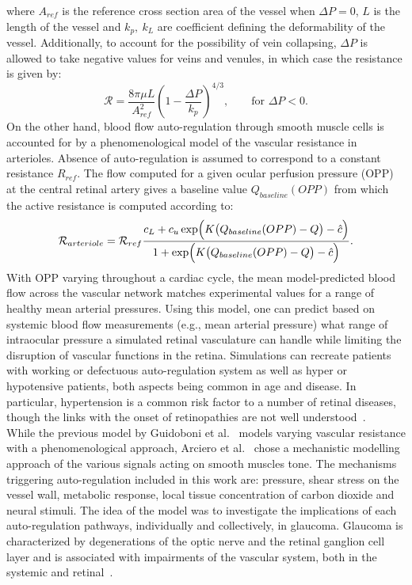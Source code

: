 \documentclass[12pt,a4paper]{journal}
\begin{document}
where $A_{ref}$ is the reference cross section area of the vessel when $\Delta P = 0$, $L$ is the length of the vessel and $k_p,~k_L$ are coefficient defining the deformability of the vessel.
Additionally, to account for the possibility of vein collapsing, $\Delta P$ is allowed to take negative values for veins and venules, in which case the resistance is given by:
\begin{equation*}
  \label{eq:PassiveVariableResistanceCollapse}
  \mathcal{R} = \frac{8\pi\mu L}{A^2_{ref}}\left(1-\frac{\Delta P}{k_p}\right)^{4/3},\qquad \text{for } \Delta P<0.
\end{equation*}
On the other hand, blood flow auto-regulation through smooth muscle cells is accounted for by a phenomenological model of the vascular resistance in arterioles.
Absence of auto-regulation is assumed to correspond to a constant resistance $R_{ref}$.
The flow computed for a given ocular perfusion pressure (OPP) at the central retinal artery gives a baseline value $Q_{baseline}(OPP)$ from which the active resistance is computed according to:
\begin{equation*}
  \label{eq:ActiveResistancePhenomenological}
  \mathcal{R}_{arteriole} = \mathcal{R}_{ref}\frac{c_L + c_u\exp\Bigl(K\bigl(Q_{baseline}(OPP)- Q\bigr)-\hat c\Bigr)}{1 + \exp\Bigl(K\bigl(Q_{baseline}(OPP)- Q\bigr)-\hat c\Bigr)}.
\end{equation*}
With OPP varying throughout a cardiac cycle, the mean model-predicted blood flow across the vascular network matches experimental values for a range of healthy mean arterial pressures.
Using this model, one can predict based on systemic blood flow measurements (e.g., mean arterial pressure) what range of intraocular pressure a simulated retinal vasculature can handle while limiting the disruption of vascular functions in the retina.
Simulations can recreate patients with working or defectuous auto-regulation system as well as hyper or hypotensive patients, both aspects being common in age and disease.
In particular, hypertension is a common risk factor to a number of retinal diseases, though the links with the onset of retinopathies are not well understood~\cite{Klein_2004, Leeman_2019}.\\
While the previous model by Guidoboni et al.~\cite{Guidoboni_2014b} models varying vascular resistance with a phenomenological approach, Arciero et al.~\cite{Arciero_2013} chose a mechanistic modelling approach of the various signals acting on smooth muscles tone.
The mechanisms triggering auto-regulation included in this work are: pressure, shear stress on the vessel wall, metabolic response, local tissue concentration of carbon dioxide and neural stimuli.
The idea of the model was to investigate the implications of each auto-regulation pathways, individually and collectively, in glaucoma.
Glaucoma is characterized by degenerations of the optic nerve and the retinal ganglion cell layer and is associated with impairments of the vascular system, both in the systemic and retinal~\cite{Hulsman_2007, Bonomi_2000}.
\end{document}
